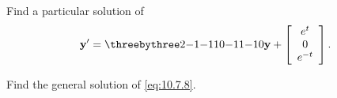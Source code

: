 \setcounter{example}{3}
\setcounter{equation}{7}
\begin{example}
  \label{example:10.7.4} \rm \mbox{}
  \newline
  \begin{alist}
    \item %
    Find a particular solution of
    \begin{equation}
      \label{eq:10.7.8}{\bf y}'=\threebythree2{-1}{-1}10{-1}1{-1}0{\bf y}+\left[
      \begin{array}{c}
        e^{t}  \\
        0      \\
        e^{-t}
      \end{array}\right].
    \end{equation}

    \item %
    Find the general solution of \eqref{eq:10.7.8}.
  \end{alist}
\end{example}
\setcounter{equation}{8}
